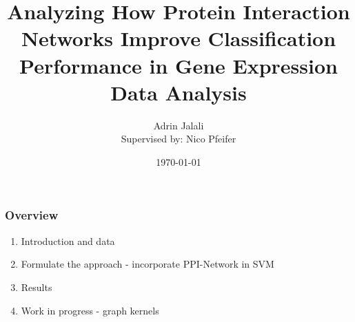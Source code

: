 \documentclass{beamer}
\begin{document}
\title[Gene Expression, PPI Network, Classification]{Analyzing How Protein Interaction Networks Improve Classification Performance in Gene Expression Data Analysis}
\author[Adrin Jalali]{Adrin Jalali \\ \small{Supervised by: Nico Pfeifer}}
\date{\today} 

\begin{frame}
\titlepage
\end{frame}

\begin{frame}
  \frametitle{Overview}
  \begin{enumerate}
  \item Introduction and data
  \item Formulate the approach - incorporate PPI-Network in SVM
  \item Results
  \item Work in progress - graph kernels
  \end{enumerate}
\end{frame}
\end{document}
